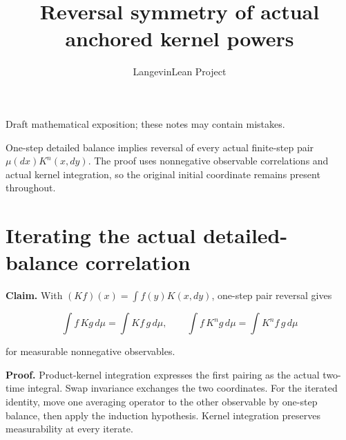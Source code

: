 \documentclass[11pt,a4paper]{article}
\title{\texorpdfstring{Reversal symmetry of actual anchored kernel powers}{Reversal symmetry of actual anchored kernel powers}}
\author{LangevinLean Project}
\date{}
\begin{document}
\maketitle
Draft mathematical exposition; these notes may contain mistakes.


One-step detailed balance implies reversal of every actual finite-step pair \(\mu(dx)K^n(x,dy)\). The proof uses nonnegative observable correlations and actual kernel integration, so the original initial coordinate remains present throughout.


\section{\texorpdfstring{Iterating the actual detailed-balance correlation}{Iterating the actual detailed-balance correlation}}


\textbf{Claim.} With \((Kf)(x)=\int f(y)K(x,dy)\), one-step pair reversal gives

\[\int f\,Kg\,d\mu=\int Kf\,g\,d\mu,\qquad\int f\,K^ng\,d\mu=\int K^nf\,g\,d\mu\]

for measurable nonnegative observables.



\textbf{Proof.} Product-kernel integration expresses the first pairing as the actual two-time integral. Swap invariance exchanges the two coordinates. For the iterated identity, move one averaging operator to the other observable by one-step balance, then apply the induction hypothesis. Kernel integration preserves measurability at every iterate.
\end{document}
